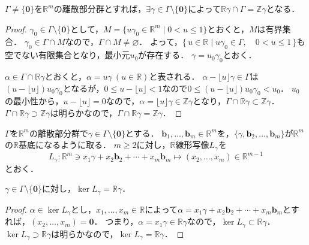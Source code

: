 \begin{screen}
  \begin{lem}
    \label{discrete_subgroup_lemma_2}
    $\Gamma\neq\{\boldsymbol{0}\}$を$\mathbb{R}^m$の離散部分群とすれば，$\exists\gamma\in\Gamma\setminus\{\boldsymbol{0}\}$によって$\mathbb{R}\gamma\cap\Gamma=\mathbb{Z}\gamma$となる．
  \end{lem}
\end{screen}
\begin{proof}
  $\gamma_0\in\Gamma\setminus\{\boldsymbol{0}\}$として，$M=\{u\gamma_0\in\mathbb{R}^m\mid0< u\leq1\}$とおくと，$M$は有界集合．
  $\gamma_0\in\Gamma\cap M$なので，$\Gamma\cap M\neq\varnothing$．
  よって，$\{\,u\in\mathbb{R}\mid u\gamma_0\in\Gamma,\quad 0< u\leq1\,\}$も空でない有限集合となり，最小元$u_0$が存在する．
  $\gamma=u_0\gamma_0$とおく．

  $\alpha\in\Gamma\cap\mathbb{R}\gamma$とおくと，$\alpha=u\gamma\ (u\in\mathbb{R})$と表される．
  $\alpha-\lfloor u\rfloor\gamma\in\Gamma$は$(u-\lfloor u\rfloor)u_0\gamma_0$となるが，$0\leq u-\lfloor u\rfloor< 1$なので$0\leq(u-\lfloor u\rfloor)u_0\gamma_0< u_0$．
  $u_0$の最小性から，$u-\lfloor u\rfloor=0$なので，$\alpha=\lfloor u\rfloor\gamma\in\mathbb{Z}\gamma$となり，$\Gamma\cap\mathbb{R}\gamma\subset\mathbb{Z}\gamma$．
  $\Gamma\cap\mathbb{R}\gamma\supset\mathbb{Z}\gamma$は明らかなので，$\Gamma\cap\mathbb{R}\gamma=\mathbb{Z}\gamma$．
\end{proof}


$\Gamma$を$\mathbb{R}^m$の離散部分群で$\gamma\in\Gamma\setminus\{\boldsymbol{0}\}$とする．
$\boldsymbol{b}_1,\ldots,\boldsymbol{b}_m\in\mathbb{R}^m$を，$\{\gamma,\boldsymbol{b}_2,\ldots,\boldsymbol{b}_m\}$が$\mathbb{R}^m$の$\mathbb{R}$基底になるように取る．
$m\geq2$に対し，$\mathbb{R}$線形写像$L_\gamma$を
\[L_\gamma\colon\mathbb{R}^m\ni x_1\gamma+x_2\boldsymbol{b}_2+\cdots+x_m\boldsymbol{b}_m\mapsto(x_2,\ldots,x_m)\in\mathbb{R}^{m-1}\]
とおく．

\begin{screen}
  \begin{lem}
    \label{discrete_subgroup_lemma_3}
    $\gamma\in\Gamma\setminus\{\boldsymbol{0}\}$に対し，$\ker L_\gamma=\mathbb{R}\gamma$．
  \end{lem}
\end{screen}
\begin{proof}
  $\alpha\in\ker L_\gamma$とし，$x_1,\ldots,x_m\in\mathbb{R}$によって$\alpha=x_1\gamma+x_2\boldsymbol{b}_2+\cdots+x_m\boldsymbol{b}_m$とすれば，$(x_2,\ldots,x_m)=\boldsymbol{0}$．
  つまり，$\alpha=x_1\gamma\in\mathbb{R}\gamma$なので，$\ker L_\gamma\subset\mathbb{R}\gamma$．
  $\ker L_\gamma\supset\mathbb{R}\gamma$は明らかなので，$\ker L_\gamma=\mathbb{R}\gamma$．
\end{proof}

